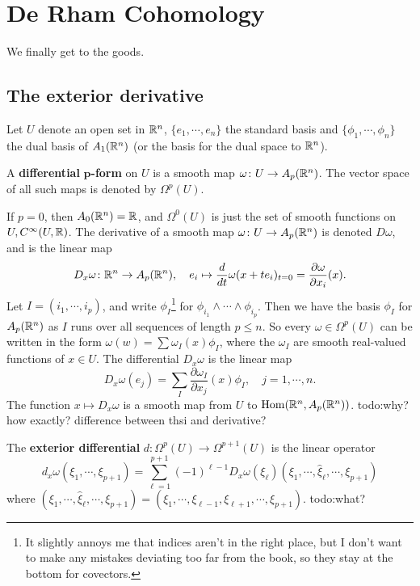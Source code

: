 \section{De Rham Cohomology} 
We finally get to the goods. 

\subsection{The exterior derivative}

Let $U$ denote an open set in $\mathbb{R}^n $, $\{e_1,\cdots ,e_n \} $ the standard basis and $\{\phi_1,\cdots ,\phi_n \} $ the dual basis of $A_1(\mathbb{R}^n )$ (or the basis for the dual space to $\mathbb{R}^n $).

\begin{definition}[]
    A \textbf{differential} $\mathbf p$\textbf{-form} on $U$ is a smooth map $\omega \colon U \to A_p(\mathbb{R}^n )$. The vector space of all such maps is denoted by $\Omega^p (U)$.
\end{definition}
If $p=0$, then $A_0(\mathbb{R}^n )=\mathbb{R}$, and $\Omega^0(U)$ is just the set of smooth functions on $U, C^{\infty}(U,\mathbb{R})$. The derivative of a smooth map $\omega \colon U \to A_p(\mathbb{R}^n )$ is denoted $D\omega$, and is the linear map \[
    D_x\omega \colon \mathbb{R}^n  \to A_p(\mathbb{R}^n ), \quad e_i  \mapsto \frac{d}{dt}\omega(x+te_i )_{t=0}=\frac{\partial \omega}{\partial x_i }(x).
\] Let $I=(i_1,\cdots ,i_p)$, and write $\phi_I$\footnote{It slightly annoys me that indices aren't in the right place, but I don't want to make any mistakes deviating too far from the book, so they stay at the bottom for covectors.} for $\phi_{i_1}\wedge \cdots \wedge \phi_{i_p}$. Then we have the basis $\phi_I$ for $A_p(\mathbb{R}^n )$ as $I$ runs over all sequences of length $p\leq n$. So every $\omega \in \Omega^p(U)$ can be written in the form $\omega (w)=\sum \omega_I(x)\phi_I$, where the $\omega_I$ are smooth real-valued functions of  $x \in U$. The differential $D_x\omega$ is the linear map \[
D_x\omega(e_j )=\sum_I \frac{\partial \omega_I}{\partial x_j }(x)\phi_I, \quad j=1,\cdots ,n.
\] The function $x \mapsto D_x\omega$ is a smooth map from $U$ to $\operatorname{Hom}(\mathbb{R}^n ,A_p(\mathbb{R}^n ))$. {\color{red}todo:why? how exactly? difference between thsi and derivative?} 
\begin{definition}[]
    The \textbf{exterior differential} $d \colon \Omega^p(U) \to \Omega^{p+1}(U)$ is the linear operator \[
        d_x\omega(\xi_1,\cdots ,\xi_{p+1})=\sum_{\ell=1}^{p+1} (-1)^{\ell-1}D_x\omega(\xi_{\ell})(\xi_1,\cdots ,\hat{\xi}_{\ell},\cdots ,\xi_{p+1})
    \] where $(\xi_1,\cdots ,\hat{\xi}_{\ell},\cdots ,\xi_{p+1})=(\xi_1,\cdots ,\xi_{\ell-1},\xi_{\ell +1},\cdots ,\xi_{p+1})$. {\color{red}todo:what?} 
\end{definition}
